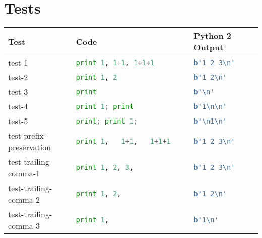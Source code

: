\section{Tests}
\begin{table*}[htb]
    \centering
    \begin{tabular}{@{}l|ll@{}}
    \toprule
    Test                                  & Code                                                  & Python 2 Output                        \\ \midrule
    test-1                               & \lstinline[language=Python, style=pythonstyle]|print 1, 1+1, 1+1+1                                  | & \lstinline[language=Python, style=pythonstyle]|b'1 2 3\n'             | \\
    test-2                               & \lstinline[language=Python, style=pythonstyle]|print 1, 2                                           | & \lstinline[language=Python, style=pythonstyle]|b'1 2\n'               | \\
    test-3                               & \lstinline[language=Python, style=pythonstyle]|print                                                | & \lstinline[language=Python, style=pythonstyle]|b'\n'                  | \\
    test-4                               & \lstinline[language=Python, style=pythonstyle]|print 1; print                                       | & \lstinline[language=Python, style=pythonstyle]|b'1\n\n'| \\
    test-5                               & \lstinline[language=Python, style=pythonstyle]|print; print 1;                                      | & \lstinline[language=Python, style=pythonstyle]|b'\n1\n'| \\
    test-prefix-preservation            & \lstinline[language=Python, style=pythonstyle]|print 1,   1+1,   1+1+1                              | & \lstinline[language=Python, style=pythonstyle]|b'1 2 3\n'             | \\
    test-trailing-comma-1              & \lstinline[language=Python, style=pythonstyle]|print 1, 2, 3,                                       | & \lstinline[language=Python, style=pythonstyle]|b'1 2 3\n'             | \\
    test-trailing-comma-2              & \lstinline[language=Python, style=pythonstyle]|print 1, 2,                                          | & \lstinline[language=Python, style=pythonstyle]|b'1 2\n'               | \\
    test-trailing-comma-3              & \lstinline[language=Python, style=pythonstyle]|print 1,                                             | & \lstinline[language=Python, style=pythonstyle]|b'1\n'                 | \\

\end{tabular}
\end{table*}

